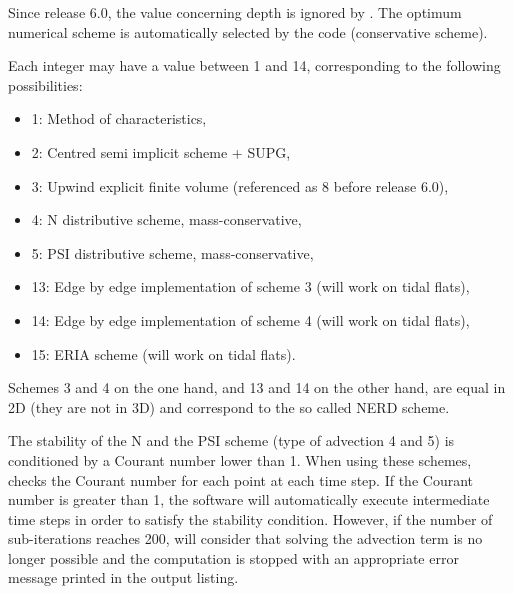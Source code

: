 Since release 6.0, the value concerning depth is ignored by .
The optimum numerical scheme is automatically selected by the code
(conservative scheme).

Each integer may have a value between 1 and 14, corresponding to the following
possibilities:

\begin{itemize}
\item 1: Method of characteristics,

\item 2: Centred semi implicit scheme + SUPG,

\item 3: Upwind explicit finite volume
(referenced as 8 before release 6.0),

\item 4: N distributive scheme, mass-conservative,

\item 5: PSI distributive scheme, mass-conservative,
%

\item 13: Edge by edge implementation of scheme 3
(will work on tidal flats),

\item 14: Edge by edge implementation of scheme 4
(will work on tidal flats),

\item 15: ERIA scheme (will work on tidal flats).
\end{itemize}

Schemes 3 and 4 on the one hand, and 13 and 14 on the other hand, are equal
in 2D (they are not in 3D) and correspond to the so called NERD scheme.

The stability of the N and the PSI scheme (type of advection 4 and 5)
is conditioned by a Courant number lower than 1.
When using these schemes,  checks the Courant number
for each point at each time step.
If the Courant number is greater than 1, the software will automatically execute
intermediate time steps in order to satisfy the stability condition.
However, if the number of sub-iterations reaches 200,  will consider
that solving the advection term is no longer possible and the computation is
stopped with an appropriate error message printed in the output listing.


